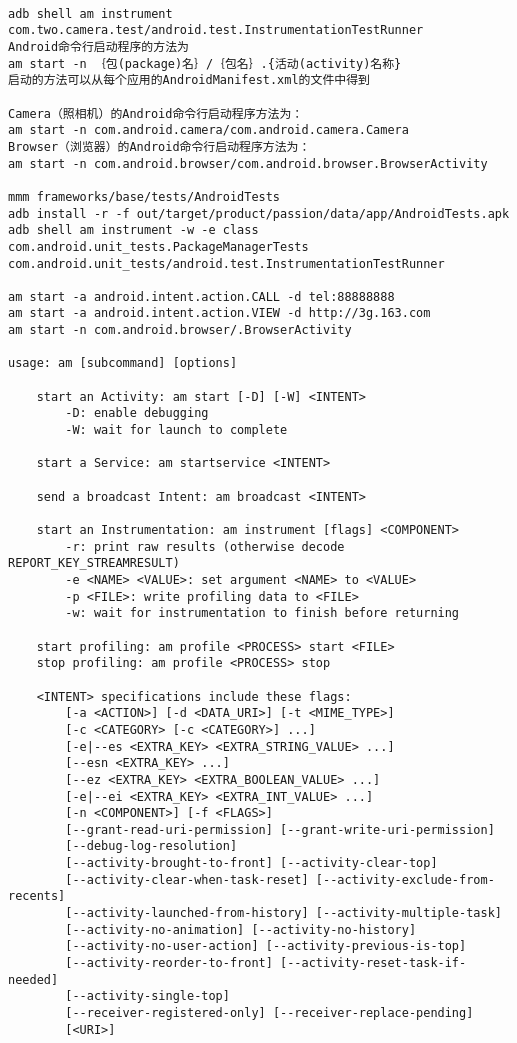 \documentclass[a4paper,titlepage]{article}
\begin{document}
\begin{verbatim}

adb shell am instrument com.two.camera.test/android.test.InstrumentationTestRunner
Android命令行启动程序的方法为
am start -n ｛包(package)名｝/｛包名｝.{活动(activity)名称} 
启动的方法可以从每个应用的AndroidManifest.xml的文件中得到

Camera（照相机）的Android命令行启动程序方法为：
am start -n com.android.camera/com.android.camera.Camera 
Browser（浏览器）的Android命令行启动程序方法为：
am start -n com.android.browser/com.android.browser.BrowserActivity 

mmm frameworks/base/tests/AndroidTests
adb install -r -f out/target/product/passion/data/app/AndroidTests.apk
adb shell am instrument -w -e class com.android.unit_tests.PackageManagerTests com.android.unit_tests/android.test.InstrumentationTestRunner

am start -a android.intent.action.CALL -d tel:88888888
am start -a android.intent.action.VIEW -d http://3g.163.com 
am start -n com.android.browser/.BrowserActivity

usage: am [subcommand] [options] 

    start an Activity: am start [-D] [-W] <INTENT> 
        -D: enable debugging 
        -W: wait for launch to complete 

    start a Service: am startservice <INTENT> 

    send a broadcast Intent: am broadcast <INTENT> 

    start an Instrumentation: am instrument [flags] <COMPONENT> 
        -r: print raw results (otherwise decode REPORT_KEY_STREAMRESULT) 
        -e <NAME> <VALUE>: set argument <NAME> to <VALUE> 
        -p <FILE>: write profiling data to <FILE> 
        -w: wait for instrumentation to finish before returning 
 
    start profiling: am profile <PROCESS> start <FILE> 
    stop profiling: am profile <PROCESS> stop 

    <INTENT> specifications include these flags: 
        [-a <ACTION>] [-d <DATA_URI>] [-t <MIME_TYPE>] 
        [-c <CATEGORY> [-c <CATEGORY>] ...] 
        [-e|--es <EXTRA_KEY> <EXTRA_STRING_VALUE> ...] 
        [--esn <EXTRA_KEY> ...] 
        [--ez <EXTRA_KEY> <EXTRA_BOOLEAN_VALUE> ...] 
        [-e|--ei <EXTRA_KEY> <EXTRA_INT_VALUE> ...] 
        [-n <COMPONENT>] [-f <FLAGS>] 
        [--grant-read-uri-permission] [--grant-write-uri-permission] 
        [--debug-log-resolution] 
        [--activity-brought-to-front] [--activity-clear-top] 
        [--activity-clear-when-task-reset] [--activity-exclude-from-recents] 
        [--activity-launched-from-history] [--activity-multiple-task] 
        [--activity-no-animation] [--activity-no-history] 
        [--activity-no-user-action] [--activity-previous-is-top] 
        [--activity-reorder-to-front] [--activity-reset-task-if-needed] 
        [--activity-single-top] 
        [--receiver-registered-only] [--receiver-replace-pending] 
        [<URI>] 
    \end{verbatim}
\end{document}

